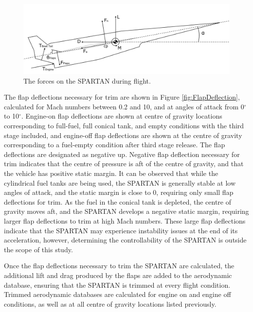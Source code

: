 		
		 
		 
		

		
		\begin{figure}[ht]
			\centering
			\includegraphics[width=0.7\linewidth]{figures/3_vehicle_design/SPARTANForces}
			\caption{The forces on the SPARTAN during flight.}
			\label{fig:SPARTANForces}
		\end{figure}
		
		The flap deflections necessary for trim are shown in Figure \ref{fig:FlapDeflection}, calculated for Mach numbers between 0.2 and 10, and at angles of attack from 0$^\circ$ to 10$^\circ$. Engine-on flap deflections are shown at centre of gravity locations corresponding to full-fuel, full conical tank, and empty conditions with the third stage included, and engine-off flap deflections are shown at the centre of gravity corresponding to a fuel-empty condition after third stage release. 
		The flap deflections are designated as negative up. Negative flap deflection necessary for trim indicates that the centre of pressure is aft of the centre of gravity, and that the vehicle has positive static margin.
		It can be observed that while the cylindrical fuel tanks are being used, the SPARTAN is generally stable at low angles of attack, and the static margin is close to 0, requiring only small flap deflections for trim. As the fuel in the conical tank is depleted, the centre of gravity moves aft, and the SPARTAN develops a negative static margin, requiring larger flap deflections to trim at high Mach numbers. These large flap deflections indicate that the SPARTAN may experience instability issues at the end of its acceleration, however, determining the controllability of the SPARTAN is outside the scope of this study. 
		
		  Once the flap deflections necessary to trim the SPARTAN are calculated, the additional lift and drag produced by the flaps are added to the aerodynamic database, ensuring that the SPARTAN is trimmed at every flight condition.
		  Trimmed aerodynamic databases are calculated for engine on and engine off conditions, as well as at all centre of gravity locations listed previously. 
		
